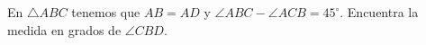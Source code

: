 En $\triangle ABC$ tenemos que $AB = AD$ y $\angle ABC − \angle ACB = 45^\circ$. Encuentra la medida en grados de $\angle CBD$.